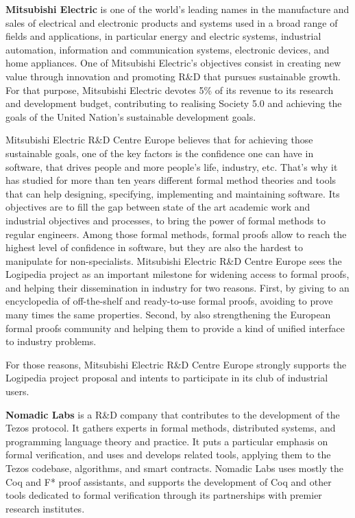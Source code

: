 {{\bf Mitsubishi Electric} is one of the world's leading names in the
manufacture and sales of electrical and electronic products and
systems used in a broad range of fields and applications, in
particular energy and electric systems, industrial automation,
information and communication systems, electronic devices, and home
appliances. One of Mitsubishi Electric's objectives consist in
creating new value through innovation and promoting R\&D that pursues
sustainable growth. For that purpose, Mitsubishi Electric devotes 5\%
of its revenue to its research and development budget, contributing to
realising Society 5.0 and achieving the goals of the United Nation's
sustainable development goals.

Mitsubishi Electric R\&D Centre Europe believes that for achieving
those sustainable goals, one of the key factors is the confidence one
can have in software, that drives people and more people's life,
industry, etc. That's why it has studied for more than ten years
different formal method theories and tools that can help designing,
specifying, implementing and maintaining software. Its objectives are
to fill the gap between state of the art academic work and industrial
objectives and processes, to bring the power of formal methods to
regular engineers. Among those formal methods, formal proofs allow to
reach the highest level of confidence in software, but they are also
the hardest to manipulate for non-specialists. Mitsubishi Electric
R\&D Centre Europe sees the Logipedia project as an important
milestone for widening access to formal proofs, and helping their
dissemination in industry for two reasons. First, by giving to an
encyclopedia of off-the-shelf and ready-to-use formal proofs, avoiding
to prove many times the same properties. Second, by also strengthening
the European formal proofs community and helping them to provide a
kind of unified interface to industry problems.

For those reasons, Mitsubishi Electric R\&D Centre Europe strongly
supports the Logipedia project proposal and intents to participate in
its club of industrial users.

{\bf Nomadic Labs} is a R\&D company that contributes to the
development of the Tezos protocol. It gathers experts in formal
methods, distributed systems, and programming language theory and
practice. It puts a particular emphasis on formal verification, and
uses and develops related tools, applying them to the Tezos codebase,
algorithms, and smart contracts. Nomadic Labs uses mostly the Coq and
F* proof assistants, and supports the development of Coq and other
tools dedicated to formal verification through its partnerships with
premier research institutes.

}
